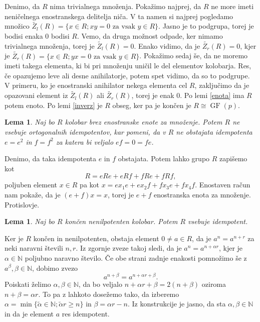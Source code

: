\documentclass[a4paper, 12pt]{amsart}
\theoremstyle{definition} %
\theoremstyle{plain} %
\newtheorem{lema}[definicija]{Lema}
\newcommand{\N}{\mathbb N}
\DeclareMathOperator{\GF}{GF}
\begin{document}
\proof
Denimo, da $R$ nima trivialnega množenja. Pokažimo najprej, da $R$ ne more imeti neničelnega enostranskega delitelja niča. V ta namen si najprej pogledamo množico $\tilde{Z_l}(R) = \{x\in R; xy = 0 \text{ za vsak } y\in R\}$. Jasno je to podgrupa, torej je bodisi enaka 0 bodisi $R$. Vemo, da druga možnost odpade, ker nimamo trivialnega množenja, torej je $\tilde{Z_l}(R) = 0$. Enako vidimo, da je $\tilde{Z_r}(R) = 0$, kjer je $\tilde{Z_r}(R) = \{x\in R; yx = 0 \text{ za vsak } y\in R\}$. Pokažimo sedaj še, da ne moremo imeti takega elementa, ki bi pri množenju uničil le del elementov kolobarja. Res, če opazujemo leve ali desne anihilatorje, potem spet vidimo, da so to podgrupe. V primeru, ko je enostranski anihilator nekega elementa cel $R$, zaključimo da je opazovani element iz $\tilde{Z_l}(R)$ ali $\tilde{Z_r}(R)$, torej je enak 0. Po lemi \ref{enota} ima $R$ potem enoto. Po lemi \ref{inverz} je $R$ obseg, ker pa je končen je $R\cong \GF(p)$.
\endproof

\begin{lema}
\label{ortogIdemp}
Naj bo $R$ kolobar brez enostranske enote za množenje. Potem $R$ ne vsebuje ortogonalnih idempotentov, kar pomeni, da v $R$ ne obstajata idempotenta $e = e^2$ in $f= f^2$ za katera bi veljalo $ef = 0 = fe$.
\end{lema}

\proof
Denimo, da taka idempotenta $e$ in $f$ obstajata. Potem lahko grupo $R$ zapišemo kot 
$$
R = eRe + eRf + fRe +fRf,
$$
poljuben element $x\in R$ pa kot $x = e x_1 e +  e x_2 f + f x_3 e + f x_4 f$. Enostaven račun nam pokaže, da je $(e+f)x = x$, torej je $e+f$ enostranska enota za množenje. Protislovje.
\endproof

\begin{lema}
\label{idempotent}
Naj bo $R$ končen nenilpotenten kolobar. Potem $R$ vsebuje idempotent.
\end{lema}

\proof
Ker je $R$ končen in nenilpotenten, obstaja element $0\neq a\in R$, da je $a^n = a^{n+r}$ za neki naravni števili $n,r$. Iz zgornje zveze takoj sledi, da je $a^n = a^{n+ \alpha r}$, kjer je $\alpha \in \N$ poljubno naravno število. Če obe strani zadnje enakosti pomnožimo še z $a^\beta, \beta \in \N$, dobimo zvezo
$$
a^{n+\beta} = a^{n+\alpha r +\beta}.
$$ 
Poiskati želimo $\alpha,\beta \in \N$, da bo veljalo $n+ \alpha r +\beta = 2(n+ \beta)$ oziroma $n+ \beta = \alpha r$. To pa z lahkoto dosežemo tako, da izberemo $ \alpha = \min\{\tilde{\alpha} \in \N; \tilde{\alpha} r \ge n \}$ in $\beta = \alpha r - n$. Iz konstrukcije je jasno, da sta $\alpha, \beta \in \N$ in da je element $a$ res idempotent.
\endproof
\end{document}
